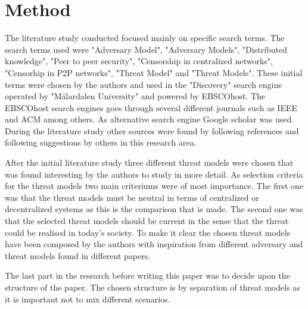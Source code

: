 \section{Method}
The literature study conducted focused mainly on specific search terms. The search terms used were "Adversary Model", "Adversary Models", "Distributed knowledge", "Peer to peer security", "Censorship in centralized networks", "Censorhip in P2P networks", "Threat Model" and "Threat Models".
These initial terms were chosen by the authors and used in the "Discovery" search engine operated by "M\"{a}lardalen University" and powered by EBSCOhost.
The EBSCOhost search engines goes through several different journals such as IEEE and ACM among others.
As alternative search engine Google scholar was used.
During the literature study other sources were found by following references and following suggestions by others in this research area.

After the initial literature study three different threat models were chosen that was found interesting by the authors to study in more detail.
As selection criteria for the threat models two main criteriums were of most importance. 
The first one was that the threat models must be neutral in terms of centralized or decentralized systems as this is the comparison that is made.
The second one was that the selected threat models should be current in the sense that the threat could be realised in today's society.
To make it clear the chosen threat models have been composed by the authors with inspiration from different adversary and threat models found in different papers.

The last part in the research before writing this paper was to decide upon the structure of the paper. The chosen structure is by separation of threat models as it is important not to mix different scenarios.
